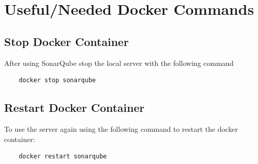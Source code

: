 \section{Useful/Needed Docker Commands}
\subsection{Stop Docker Container}
After using SonarQube stop the local server with the following command
\begin{lstlisting}
    docker stop sonarqube
\end{lstlisting}

\subsection{Restart Docker Container}
To use the server again using the following command to restart the docker container:
\begin{lstlisting}
    docker restart sonarqube
\end{lstlisting}